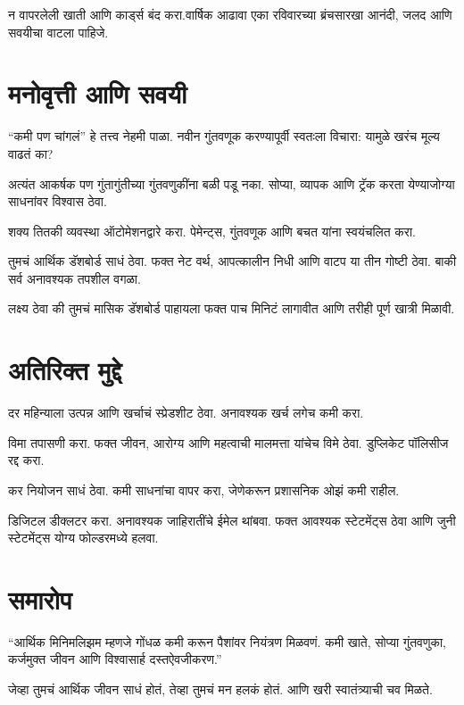 न वापरलेली खाती आणि कार्ड्स बंद करा.वार्षिक आढावा एका रविवारच्या ब्रंचसारखा आनंदी, जलद आणि सवयीचा वाटला पाहिजे.



\section*{मनोवृत्ती आणि सवयी}

“कमी पण चांगलं” हे तत्त्व नेहमी पाळा. नवीन गुंतवणूक करण्यापूर्वी स्वतःला विचारा: यामुळे खरंच मूल्य वाढतं का?

अत्यंत आकर्षक पण गुंतागुंतीच्या गुंतवणुकींना बळी पडू नका. सोप्या, व्यापक आणि ट्रॅक करता येण्याजोग्या साधनांवर विश्वास ठेवा.

शक्य तितकी व्यवस्था ऑटोमेशनद्वारे करा. पेमेन्ट्स, गुंतवणूक आणि बचत यांना स्वयंचलित करा.

तुमचं आर्थिक डॅशबोर्ड साधं ठेवा. फक्त नेट वर्थ, आपत्कालीन निधी आणि वाटप या तीन गोष्टी ठेवा.
बाकी सर्व अनावश्यक तपशील वगळा.

लक्ष्य ठेवा की तुमचं मासिक डॅशबोर्ड पाहायला फक्त पाच मिनिटं लागावीत आणि तरीही पूर्ण खात्री मिळावी.



\section*{अतिरिक्त मुद्दे}

दर महिन्याला उत्पन्न आणि खर्चाचं स्प्रेडशीट ठेवा. अनावश्यक खर्च लगेच कमी करा.

विमा तपासणी करा. फक्त जीवन, आरोग्य आणि महत्वाची मालमत्ता यांचेच विमे ठेवा. डुप्लिकेट पॉलिसीज रद्द करा.

कर नियोजन साधं ठेवा. कमी साधनांचा वापर करा, जेणेकरून प्रशासनिक ओझं कमी राहील.

डिजिटल डीक्लटर करा. अनावश्यक जाहिरातींचे ईमेल थांबवा. फक्त आवश्यक स्टेटमेंट्स ठेवा आणि जुनी स्टेटमेंट्स योग्य फोल्डरमध्ये हलवा.

\section*{समारोप}

“आर्थिक मिनिमलिझम म्हणजे गोंधळ कमी करून पैशांवर नियंत्रण मिळवणं. कमी खाते, सोप्या गुंतवणुका, कर्जमुक्त जीवन आणि विश्वासार्ह दस्तऐवजीकरण.”


जेव्हा तुमचं आर्थिक जीवन साधं होतं, तेव्हा तुमचं मन हलकं होतं. आणि खरी स्वातंत्र्याची चव मिळते.


